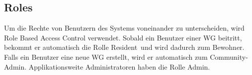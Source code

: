\subsection*{Roles}
Um die Rechte von Benutzern des Systems voneinander zu unterscheiden, wird Role Based Access Control \cite[Kapitel~8.2]{RBAC} verwendet.
Sobald ein Benutzer einer \gls{WG} beitritt, bekommt er automatisch die Rolle \flqq Resident\frqq\ und wird dadurch zum \gls{Bewohner}.
Falls ein Benutzer eine neue \gls{WG} erstellt, wird er automatisch zum \flqq Community-Admin\frqq.
Applikationsweite Administratoren haben die Rolle \flqq Admin\frqq.
